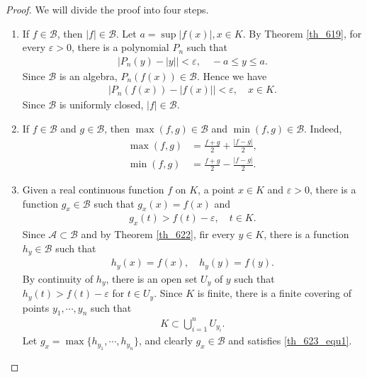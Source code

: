 \documentclass[10pt]{book}
\theoremstyle{definition}
\numberwithin{equation}{chapter}
\begin{document}
\begin{proof}
We will divide the proof into four steps.
\begin{enumerate}[label=(\Roman*)]
    \item If $f \in \mathscr{B}$, then $\left|f\right| \in \mathscr{B}$. Let $a = \sup \left|f(x)\right|, x \in K$. By Theorem \ref{th_619}, for every $\varepsilon > 0$, there is a polynomial $P_n$ such that
    \begin{align*}
        \left|P_n(y) - \left|y\right|\right| < \varepsilon, \quad -a \leq y \leq a.
    \end{align*}
    Since $\mathscr{B}$ is an algebra, $P_n(f(x)) \in \mathscr{B}$. Hence we have 
    \begin{align*}
        \left|P_n(f(x)) - \left|f(x)\right|\right| < \varepsilon, \quad x \in K.
    \end{align*}
    Since $\mathscr{B}$ is uniformly closed, $\left|f\right| \in \mathscr{B}$.
    
    \item If $f \in \mathscr{B}$ and $g \in \mathscr{B}$, then $\max (f,g) \in \mathscr{B}$ and $\min (f,g) \in \mathscr{B}$. Indeed, 
    \begin{align*}
        \max(f,g) & = \frac{f + g}{2} + \frac{\left|f - g\right|}{2}, \\
        \min(f,g) & = \frac{f + g}{2} - \frac{\left|f - g\right|}{2}.
    \end{align*}
    
    \item Given a real continuous function $f$ on $K$, a point $x \in K$ and $\varepsilon > 0$, there is a function $g_x \in \mathscr{B}$ such that $g_x(x) = f(x)$ and
    \begin{align}\label{th_623_equ1}
        g_x(t) > f(t) - \varepsilon, \quad t \in K.
    \end{align}
    Since $\mathscr{A} \subset \mathscr{B}$ and by Theorem \ref{th_622}, fir every $y \in K$, there is a function $h_y \in \mathscr{B}$ such that
    \begin{align*}
        h_y(x) = f(x), \quad h_y(y) = f(y).
    \end{align*}
    By continuity of $h_y$, there is an open set $U_y$ of $y$ such that $h_y(t) > f(t) - \varepsilon$ for $t \in U_y$. Since $K$ is finite, there is a finite covering of points $y_1, \cdots, y_n$ such that 
    \begin{align*}
        K \subset \bigcup^n_{i=1} U_{y_i}.
    \end{align*}
    Let $g_x = \max \{h_{y_1}, \cdots, h_{y_n}\}$, and clearly $g_x \in \mathscr{B}$ and satisfies \eqref{th_623_equ1}. 
    \label{th_623_3}
    

\end{enumerate}
\end{proof}
\end{document}
